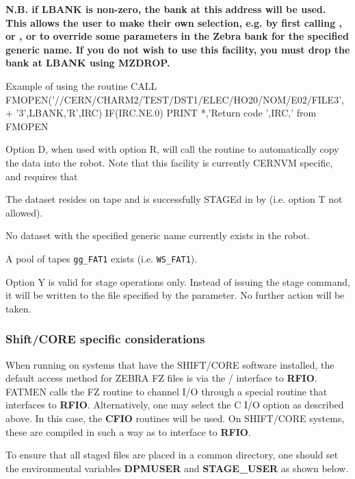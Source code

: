 {\bf N.B. if LBANK is non-zero, the bank at this address
will be used. This allows the user to make their own
selection, e.g. by first calling ,  or , or to override
some parameters in the Zebra bank for the specified generic name.
If you do not wish to use this facility, you must drop the
bank at LBANK using MZDROP.}
\begin{XMPt} {Example of using the \protect{} routine}
      CALL FMOPEN('//CERN/CHARM2/TEST/DST1/ELEC/HO20/NOM/E02/FILE3',
     +            '3',LBANK,'R',IRC)
      IF(IRC.NE.0) PRINT *,'Return code ',IRC,' from FMOPEN
\end{XMPt}
\par
Option D, when used with option R, will call the routine 
to automatically copy the data into the robot. Note that this facility
is currently CERNVM specific, and requires that
\begin{OL}
\item
The dataset resides on tape and is successfully STAGEd in by  (i.e.
option T not allowed).
\item
No dataset with the specified generic name currently exists in the
robot.
\item
A pool of tapes {\tt gg\_FAT1} exists (i.e. {\tt WS\_FAT1}).
\end{OL}

Option Y is valid for stage operations only. Instead of issuing the
stage command, it will be written to the file specified by the
 parameter. No further action will be taken.

\subsubsection{Shift/CORE specific considerations}
When running on systems that have the SHIFT/CORE software installed,
the default access method for ZEBRA FZ files is via the
/ interface to {\bf RFIO}. FATMEN calls the
FZ routine  to channel I/O through a special routine
that interfaces to {\bf RFIO}. Alternatively, one may select
the C I/O option as described above. In this case, the {\bf CFIO} routines will be
used. On SHIFT/CORE systems, these are compiled in such a way
as to interface to {\bf RFIO}.

To ensure that all staged files are placed in a common directory,
one should set the environmental variables {\bf DPMUSER} and {\bf STAGE\_USER}
as shown below.

